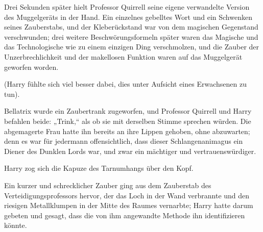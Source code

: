 Drei Sekunden später hielt Professor Quirrell seine eigene verwandelte Version des Muggelgeräts in der Hand. Ein einzelnes gebelltes Wort und ein Schwenken seines Zauberstabs, und der Kleberückstand war von dem magischen Gegenstand verschwunden; drei weitere Beschwörungsformeln später waren das Magische und das Technologische wie zu einem einzigen Ding verschmolzen, und die Zauber der Unzerbrechlichkeit und der makellosen Funktion waren auf das Muggelgerät geworfen worden.

(Harry fühlte sich viel besser dabei, dies unter Aufsicht eines Erwachsenen zu tun).

Bellatrix wurde ein Zaubertrank zugeworfen, und Professor Quirrell und Harry befahlen beide: „Trink,“ als ob sie mit derselben Stimme sprechen würden. Die abgemagerte Frau hatte ihn bereits an ihre Lippen gehoben, ohne abzuwarten; denn es war für jedermann offensichtlich, dass dieser Schlangenanimagus ein Diener des Dunklen Lords war, und zwar ein mächtiger und vertrauenswürdiger.

Harry zog sich die Kapuze des Tarnumhangs über den Kopf.

Ein kurzer und schrecklicher Zauber ging aus dem Zauberstab des Verteidigungsprofessors hervor, der das Loch in der Wand verbrannte und den riesigen Metallklumpen in der Mitte des Raumes vernarbte; Harry hatte darum gebeten und gesagt, dass die von ihm angewandte Methode ihn identifizieren könnte.

